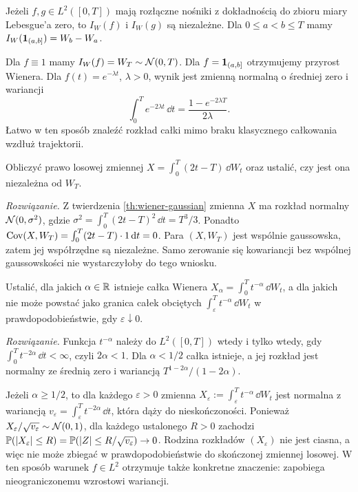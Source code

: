 \begin{wniosek}
Jeżeli $f,g\in L^2([0,T])$ mają rozłączne nośniki z dokładnością
do zbioru miary Lebesgue'a zero, to $I_W(f)$ i $I_W(g)$
są niezależne. Dla $0\le a<b\le T$ mamy
$I_W(\mathbf{1}_{(a,b]})=W_b-W_a$.
\end{wniosek}

\begin{przyklad}
Dla $f\equiv1$ mamy $I_W(f)=W_T\sim\mathcal{N}(0,T)$.
Dla $f=\mathbf{1}_{(a,b]}$ otrzymujemy przyrost Wienera.
Dla $f(t)=e^{-\lambda t}$, $\lambda>0$, wynik jest
zmienną normalną o średniej zero i wariancji
\[
\int_0^Te^{-2\lambda t}\,\dd t
=\frac{1-e^{-2\lambda T}}{2\lambda}.
\]
Łatwo w ten sposób znaleźć rozkład całki mimo braku
klasycznego całkowania wzdłuż trajektorii.
\end{przyklad}

\begin{zadanie}
Obliczyć prawo losowej zmiennej
$X=\int_0^T(2t-T)\,\dd W_t$ oraz ustalić,
czy jest ona niezależna od $W_T$.

\emph{Rozwiązanie.}
Z twierdzenia \ref{th:wiener-gaussian} zmienna $X$ ma rozkład
normalny $\mathcal{N}(0,\sigma^2)$, gdzie
$\sigma^2=\int_0^T(2t-T)^2\,\dd t=T^3/3$.
Ponadto
$\operatorname{Cov}(X,W_T)=\int_0^T(2t-T)\cdot1\,\mathrm{d} t=0$.
Para $(X,W_T)$ jest wspólnie gaussowska, zatem jej
współrzędne są niezależne. Samo zerowanie się kowariancji
bez wspólnej gaussowskości nie wystarczyłoby do tego wniosku.
\end{zadanie}


\begin{zadanie}
Ustalić, dla jakich $\alpha\in\mathbb{R}$ istnieje całka Wienera
$X_\alpha=\int_0^Tt^{-\alpha}\,\dd W_t$, a dla jakich
nie może powstać jako granica całek obciętych
$\int_\varepsilon^Tt^{-\alpha}\,\dd W_t$
w prawdopodobieństwie, gdy $\varepsilon\downarrow0$.

\emph{Rozwiązanie.} Funkcja $t^{-\alpha}$ należy do
$L^2([0,T])$ wtedy i tylko wtedy, gdy
$\int_0^Tt^{-2\alpha}\,\dd t<\infty$, czyli
$2\alpha<1$. Dla $\alpha<1/2$ całka istnieje,
a jej rozkład jest normalny ze średnią zero i wariancją
$T^{1-2\alpha}/(1-2\alpha)$.

Jeżeli $\alpha\ge1/2$, to dla każdego $\varepsilon>0$
zmienna $X_\varepsilon:=\int_\varepsilon^T t^{-\alpha}\,\dd W_t$
jest normalna z wariancją
$v_\varepsilon=\int_\varepsilon^Tt^{-2\alpha}\,\dd t$,
która dąży do nieskończoności. Ponieważ
$X_\varepsilon/\sqrt{v_\varepsilon}\sim\mathcal{N}(0,1)$,
dla każdego ustalonego $R>0$ zachodzi
$\mathbb{P}(|X_\varepsilon|\le R)
=\mathbb{P}(|Z|\le R/\sqrt{v_\varepsilon})\to0$.
Rodzina rozkładów $(X_\varepsilon)$ nie jest ciasna,
a więc nie może zbiegać w prawdopodobieństwie do
skończonej zmiennej losowej. W ten sposób warunek
$f\in L^2$ otrzymuje także konkretne znaczenie:
zapobiega nieograniczonemu wzrostowi wariancji.
\end{zadanie}

